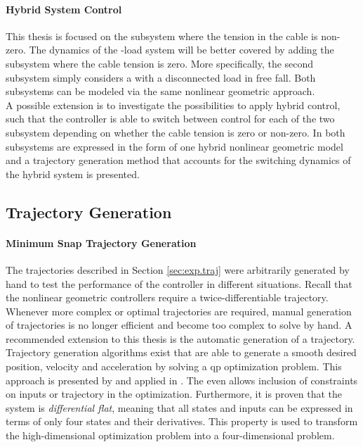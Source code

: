 \paragraph{Hybrid System Control}
This thesis is focused on the subsystem where the tension in the cable is non-zero.
The dynamics of the -load system will be better covered by adding the subsystem where the cable tension is zero. 
More specifically, the second subsystem simply considers a  with a disconnected load in free fall.
Both subsystems can be modeled via the same nonlinear geometric approach.\\
A possible extension is to investigate the possibilities to apply hybrid control, 
such that the controller is able to switch between control for each of the two subsystem depending on whether the cable tension is zero or non-zero.
In \cite{Sreenath2013c,Tang2014,Tang2015} both subsystems are expressed in the form of one hybrid nonlinear geometric model and a trajectory generation method that accounts for the switching dynamics of the hybrid system is presented. 

\subsection{Trajectory Generation}
\paragraph{Minimum Snap Trajectory Generation}
The trajectories described in Section \ref{sec:exp.traj} were arbitrarily generated by hand to test the performance of the controller in different situations. 
Recall that the nonlinear geometric controllers require a twice-differentiable trajectory. Whenever more complex or optimal trajectories are required, manual generation of trajectories is no longer efficient and become too complex to solve by hand. A recommended extension to this thesis is the automatic generation of a trajectory.\\ 
Trajectory generation algorithms exist that are able to generate a smooth desired position, velocity and acceleration by solving a \acs{qp} optimization problem. 
This approach is presented by \cite{Mellinger2011} and applied in \cite{Tang2014,Tang2015}. 
The  even allows inclusion of constraints on inputs or trajectory in the optimization.
Furthermore, it is proven that the system is \textit{differential flat}, meaning that all states and inputs can be expressed in terms of only four states and their derivatives. This property is used to transform the high-dimensional optimization problem into a four-dimensional problem.
